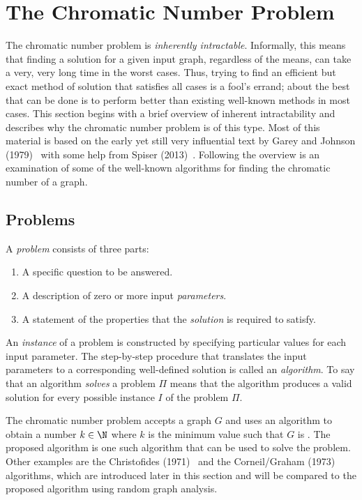 \section{The Chromatic Number Problem}\label{sec:chromatic}

The chromatic number problem is \emph{inherently intractable}.  Informally, this means that finding a solution for
a given input graph, regardless of the means, can take a very, very long time in the worst cases.  Thus, trying to
find an efficient but exact method of solution that satisfies all cases is a fool's errand; about the best that can
be done is to perform better than existing well-known methods in most cases.  This section begins with a brief
overview of inherent intractability and describes why the chromatic number problem is of this type.  Most of this
material is based on the early yet still very influential text by Garey and Johnson (1979)~\cite{garey} with some
help from Spiser (2013)~\cite{sipser}.  Following the overview is an examination of some of the well-known
algorithms for finding the chromatic number of a graph.

\subsection{Problems}\label{sec:sub:problems}

A \emph{problem} consists of three parts:

\begin{enumerate}
\item A specific question to be answered.
\item A description of zero or more input \emph{parameters}.
\item A statement of the properties that the \emph{solution} is required to satisfy.
\end{enumerate}

An \emph{instance} of a problem is constructed by specifying particular values for each input parameter.  The
step-by-step procedure that translates the input parameters to a corresponding well-defined solution is called an
\emph{algorithm}.  To say that an algorithm \emph{solves} a problem \(\Pi\) means that the algorithm produces a
valid solution for every possible instance \(I\) of the problem \(\Pi\).

The chromatic number problem accepts a graph \(G\) and uses an algorithm to obtain a number \(k\in\N\) where \(k\)
is the minimum value such that \(G\) is .  The proposed algorithm is one such algorithm that can be
used to solve the problem.  Other examples are the Christofides (1971)~\cite{christofides} and the Corneil/Graham
(1973)~\cite{corneil} algorithms, which are introduced later in this section and will be compared to the proposed
algorithm using random graph analysis.

